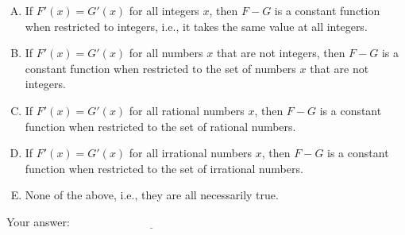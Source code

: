 \documentclass[10pt]{amsart}
\begin{document}
\begin{enumerate}
  \begin{enumerate}[(A)]
  \item If $F'(x) = G'(x)$ for all integers $x$, then $F - G$ is a
    constant function when restricted to integers, i.e., it takes the
    same value at all integers.
  \item If $F'(x) = G'(x)$ for all numbers $x$ that are not integers,
    then $F - G$ is a constant function when restricted to the set of
    numbers $x$ that are not integers.
  \item If $F'(x) = G'(x)$ for all rational numbers $x$, then $F - G$
    is a constant function when restricted to the set of rational
    numbers.
  \item If $F'(x) = G'(x)$ for all irrational numbers $x$, then $F -
    G$ is a constant function when restricted to the set of irrational
    numbers.
  \item None of the above, i.e., they are all necessarily true.
  \end{enumerate}

  \vspace{0.1in}
  Your answer: $\underline{\qquad\qquad\qquad\qquad\qquad\qquad\qquad}$
  \vspace{1in}

\end{enumerate}
\end{document}
